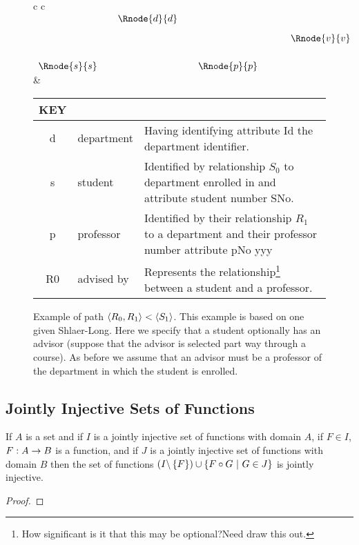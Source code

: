 \begin{figure} [h]  %
\begin{center}
\begin{tabular}{c c}
$
\begin{array}{cp{0.05cm}c  p{0.05cm}c p{0.5cm}c}
                & & \Rnode{d}{d} & &              & &             \\ [0.3cm]
								& &              & &              & & \Rnode{v}{v} \\ [0.6cm]     
	 \Rnode{s}{s} & &              & & \Rnode{p}{p} & &             
\end{array}
$
\idcomp
{} 
\idcomp
{} 
\idcomp
{} 
\idcomp
{} 
\idcomp
& \footnotesize
\begin{tabular}{c p{1.5cm} p{4cm}}
KEY && \\
\hline
d & department & Having identifying attribute Id the department identifier. \\
s & student & Identified by relationship $S_0$ to department enrolled in and  attribute student number SNo. \\
p & professor & Identified by their relationship $R_1$ to a department and their professor number attribute pNo yyy \\
R0 & advised by & Represents the relationship\footnote{How significant is it that this may be optional?Need draw this out.} between a student and a professor.\\
\end{tabular} 
\end{tabular}
\end{center}
\caption{Example of path  $\langle R_0,R_1\rangle < \langle S_1\rangle$. This example is based on one given Shlaer-Long. Here we specify that a student optionally has an advisor (suppose that the advisor is selected part way through a course). As before we assume that an advisor must be a professor of the department in which the student is enrolled. }
\label{studentadvisorgraph}
\end{figure}

\subsection{Jointly Injective Sets of Functions}
\begin{lemma}
\label{jointlyinjectivecomposition}
If $A$ is a set and if $I$  is a jointly injective set of functions with domain $A$, if $F \in I$, $F: A \rightarrow B$ is a function,
and if $J$ is a jointly injective set of functions with domain $B$ then the set of functions
$(I \backslash \left\{F\right\}) \cup \left\{F \circ G \ \middle|\ G \in J\right\}$ is jointly injective.
\end{lemma}
\begin{proof}

\end{proof}


